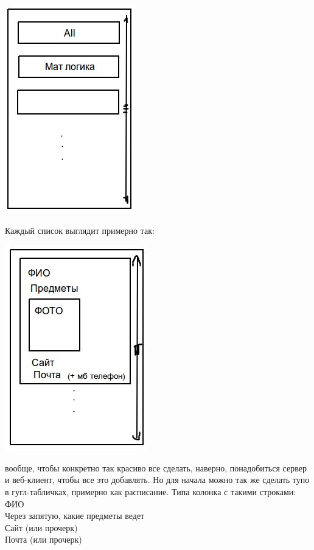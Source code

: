 \documentclass[12pt]{article}
\begin{document}
\includegraphics{contacts1.jpg}

Каждый список выглядит примерно так:

\includegraphics{contacts2.jpg}

вообще, чтобы конкретно так красиво все сделать, наверно, понадобиться сервер
и веб-клиент, чтобы все это добавлять. Но для начала можно так же сделать
тупо в гугл-табличках, примерно как расписание. Типа колонка с такими
строками:\\
ФИО\\
Через запятую, какие предметы ведет\\
Сайт (или прочерк)\\
Почта (или прочерк)
\end{document}
